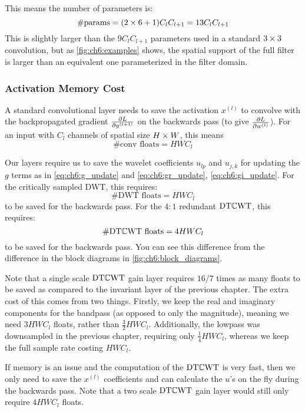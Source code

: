 This means the number of parameters is:
\begin{equation}
  \text{\#params} = (2\times 6 + 1)C_lC_{l+1} = 13C_lC_{l+1} \label{eq:ch6:memcost2}
\end{equation} 
%
This is slightly larger than the $9C_lC_{l+1}$ parameters used in a
standard $3\times 3$ convolution, but as \autoref{fig:ch6:examples} shows, the
spatial support of the full filter is larger than an equivalent one
parameterized in the filter domain. 

\subsubsection{Activation Memory Cost}\label{sec:ch6:act_memory}
A standard convolutional layer needs to save the activation $x^{(l)}$ to
convolve with the backpropagated gradient $\frac{\partial L}{\partial y^{(l+1)}}$ on the backwards
pass (to give $\frac{\partial L}{\partial w^{(l)}}$). For an input with $C_l$ channels of spatial
size $H\times W$, this means
%
\begin{equation}
  \text{\#conv floats} = HWC_l 
\end{equation}

Our layers require us to save the wavelet coefficients $u_{lp}$ and  $u_{j,k}$
for updating the $g$ terms as in \eqref{eq:ch6:g_update} and
\eqref{eq:ch6:gr_update}, \eqref{eq:ch6:gi_update}.  For the critically sampled
DWT, this requires:
%
\begin{equation}
  \text{\#DWT floats} = HWC_l 
\end{equation}
%
to be saved for the backwards pass. For the $4:1$ redundant $\mathrm{DT}\mathbb{C}\mathrm{WT}$, this 
requires:
%
\begin{equation}
  \text{\#$\mathrm{DT}\mathbb{C}\mathrm{WT}$ floats} = 4HWC_l 
\end{equation}
%
to be saved for the backwards pass.  You can see this difference from the
difference in the block diagrams in \autoref{fig:ch6:block_diagrams}.

Note that a single scale $\mathrm{DT}\mathbb{C}\mathrm{WT}$ gain layer requires $16/7$ times as many
floats to be saved as compared to the invariant layer of the previous chapter.
The extra cost of this comes from two things. Firstly, we keep the real and
imaginary components for the bandpass (as opposed to only the magnitude),
meaning we need $3HWC_l$ floats, rather than $\frac{3}{2}HWC_l$. Additionally,
the lowpass was downsampled in the previous chapter, requiring only
$\frac{1}{4}HWC_l$, whereas we keep the full sample rate costing $HWC_l$.

If memory is an issue and the computation of the $\mathrm{DT}\mathbb{C}\mathrm{WT}$ is very fast, then we
only need to save the $x^(l)$ coefficients and can calculate the $u$'s on the
fly during the backwards pass. Note that a two scale $\mathrm{DT}\mathbb{C}\mathrm{WT}$ gain layer would
still only require $4HWC_l$ floats.

